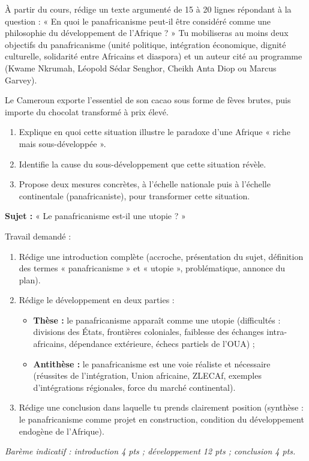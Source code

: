 \documentclass[11pt]{article}
\newcounter{popsec}
\newcounter{popsub}
\newcommand{\courssub}[1]{%
  \stepcounter{popsub}%
  \par\vspace{9pt}\noindent{\popxbold\fontsize{11.5}{13}\selectfont\color{popink}{\color{poporange}\thepopsec.\thepopsub}\hspace{6pt}#1}\par\nopagebreak\vspace{4pt}
}
\begin{document}
\begin{exercice}
À partir du cours, rédige un texte argumenté de 15 à 20 lignes répondant à la question : « En quoi le panafricanisme peut-il être considéré comme une philosophie du développement de l'Afrique ? » Tu mobiliseras au moins deux objectifs du panafricanisme (unité politique, intégration économique, dignité culturelle, solidarité entre Africains et diaspora) et un auteur cité au programme (Kwame Nkrumah, Léopold Sédar Senghor, Cheikh Anta Diop ou Marcus Garvey).
\end{exercice}

\begin{exercice}
Le Cameroun exporte l'essentiel de son cacao sous forme de fèves brutes, puis importe du chocolat transformé à prix élevé.
\begin{enumerate}
\item Explique en quoi cette situation illustre le paradoxe d'une Afrique « riche mais sous-développée ».
\item Identifie la cause du sous-développement que cette situation révèle.
\item Propose deux mesures concrètes, à l'échelle nationale puis à l'échelle continentale (panafricaniste), pour transformer cette situation.
\end{enumerate}
\end{exercice}

\courssub{Je me prépare au Bac}

\begin{exercice}
\textbf{Sujet :} « Le panafricanisme est-il une utopie ? »

Travail demandé :
\begin{enumerate}
\item Rédige une introduction complète (accroche, présentation du sujet, définition des termes « panafricanisme » et « utopie », problématique, annonce du plan).
\item Rédige le développement en deux parties :
\begin{itemize}
\item \textbf{Thèse :} le panafricanisme apparaît comme une utopie (difficultés : divisions des États, frontières coloniales, faiblesse des échanges intra-africains, dépendance extérieure, échecs partiels de l'OUA) ;
\item \textbf{Antithèse :} le panafricanisme est une voie réaliste et nécessaire (réussites de l'intégration, Union africaine, ZLECAf, exemples d'intégrations régionales, force du marché continental).
\end{itemize}
\item Rédige une conclusion dans laquelle tu prends clairement position (synthèse : le panafricanisme comme projet en construction, condition du développement endogène de l'Afrique).
\end{enumerate}
\emph{Barème indicatif : introduction 4 pts ; développement 12 pts ; conclusion 4 pts.}
\end{exercice}
\end{document}
